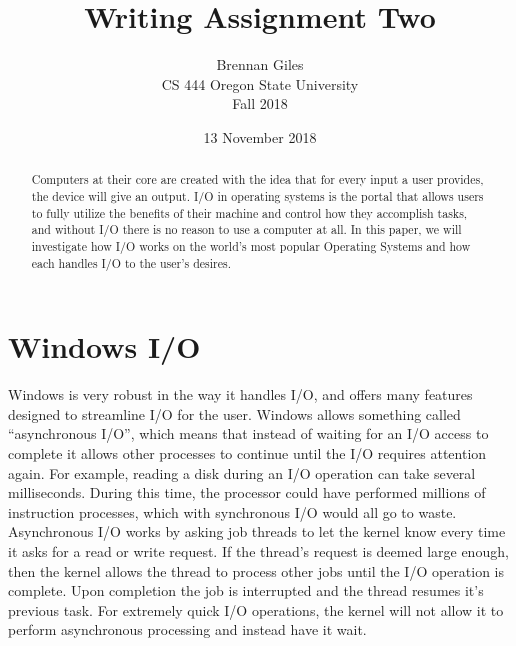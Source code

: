 \documentclass[onecolumn, draftclsnofoot,10pt, compsoc]{IEEEtran}
\title{Writing Assignment Two}
\author{Brennan Giles\\CS 444 Oregon State University\\Fall 2018}
\date {13 November 2018}
\begin{document}
\begin{titlepage}
	\maketitle
    \begin{singlespace}
        \begin{abstract}
		Computers at their core are created with the idea that for every input a user provides, the device will give an output. I/O in operating systems is the portal that allows users to fully utilize the benefits of their machine and control how they accomplish tasks, and without I/O there is no reason to use a computer at all. In this paper, we will investigate how I/O works on the world’s most popular Operating Systems and how each handles I/O to the user’s desires. 
        	
        \end{abstract}     
    \end{singlespace}
\end{titlepage}
\newpage
{}

\clearpage

\section{Windows I/O}
Windows is very robust in the way it handles I/O, and offers many features designed to streamline I/O for the user. Windows allows something called “asynchronous I/O”, which means that instead of waiting for an I/O access to complete it allows other processes to continue until the I/O requires attention again. For example, reading a disk during an I/O operation can take several milliseconds. During this time, the processor could have performed millions of instruction processes, which with synchronous I/O would all go to waste. Asynchronous I/O works by asking job threads to let the kernel know every time it asks for a read or write request. If the thread’s request is deemed large enough, then the kernel allows the thread to process other jobs until the I/O operation is complete. Upon completion the job is interrupted and the thread resumes it’s previous task. For extremely quick I/O operations, the kernel will not allow it to perform asynchronous processing and instead have it wait. \cite{WindowsDev} 
\end{document}
